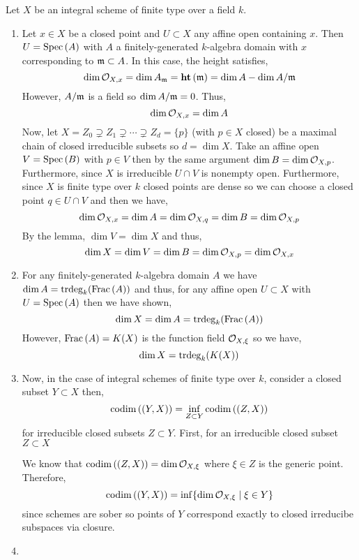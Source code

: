 \documentclass[12pt]{article}
\begin{document}
Let $X$ be an integral scheme of finite type over a field $k$.
\begin{enumerate}
\item Let $x \in X$ be a closed point and $U \subset X$ any affine open containing $x$. Then $U = \mathrm{Spec}\left( A \right)$ with $A$ a finitely-generated $k$-algebra domain with $x$ corresponding to $\mathfrak{m} \subset A$. In this case, the height satisfies,
\[ \dim{\mathcal{O}_{X, x}} = \dim{A_{\mathfrak{m}}} = \mathbf{ht}\left( \mathfrak{m} \right) = \dim{A} - \dim{A / \mathfrak{m}} \]
However, $A / \mathfrak{m}$ is a field so $\dim{A / \mathfrak{m}} = 0$. Thus,
\[ \dim{\mathcal{O}_{X, x}} =  \dim{A} \]
Now, let $X = Z_0 \supsetneq Z_1 \supsetneq \cdots \supsetneq Z_d = \{ p \}$ (with $p \in X$ closed) be a maximal chain of closed irreducible subsets so $d = \dim{X}$. Take an affine open $V = \mathrm{Spec}\left( B \right)$ with $p \in V$ then by the same argument $\dim{B} = \dim{\mathcal{O}_{X, p}}$. Furthermore, since $X$ is irreducible $U \cap V$ is nonempty open. Furthermore, since $X$ is finite type over $k$ closed points are dense so we can choose a closed point $q \in U \cap V$ and then we have,
\[ \dim{\mathcal{O}_{X, x}} = \dim{A} = \dim{\mathcal{O}_{X, q}} = \dim{B} = \dim{\mathcal{O}_{X, p}} \]
By the lemma, $\dim{V} = \dim{X}$ and thus,
\[ \dim{X} = \dim{V} = \dim{B} = \dim{\mathcal{O}_{X, p}} =  \dim{\mathcal{O}_{X, x}} \]
\item For any finitely-generated $k$-algebra domain $A$ we have $\dim{A} = \mathrm{trdeg}_{k}(\mathrm{Frac}\left(A\right))$ and thus, for any affine open $U \subset X$ with $U = \mathrm{Spec}\left( A \right)$ then we have shown,
\[ \dim{X} = \dim{A} = \mathrm{trdeg}_{k}(\mathrm{Frac}\left(A\right)) \]
However, $\mathrm{Frac}\left(A\right) = K(X)$ is the function field $\mathcal{O}_{X, \xi}$ so we have,
\[ \dim{X} = \mathrm{trdeg}_{k}(K(X)) \]
\item 
Now, in the case of integral schemes of finite type over $k$, consider a closed subset $Y \subset X$ then,
\[ \mathrm{codim}\left( (Y, X) \right) = \inf_{Z \subset Y} \mathrm{codim}\left( (Z, X) \right) \]
for irreducible closed subsets $Z \subset Y$. First, for an irreducible closed subset $Z \subset X$ 

We know that $\mathrm{codim}\left( (Z, X) \right) = \dim{\mathcal{O}_{X, \xi}}$ where $\xi \in Z$ is the generic point. Therefore, 
\[ \mathrm{codim}\left( (Y, X) \right) = \inf \{ \dim{\mathcal{O}_{X, \xi}} \mid \xi \in Y \} \]
since schemes are sober so points of $Y$ correspond exactly to closed irreducibe subspaces via closure. 

\item 


\end{enumerate}
\end{document}

